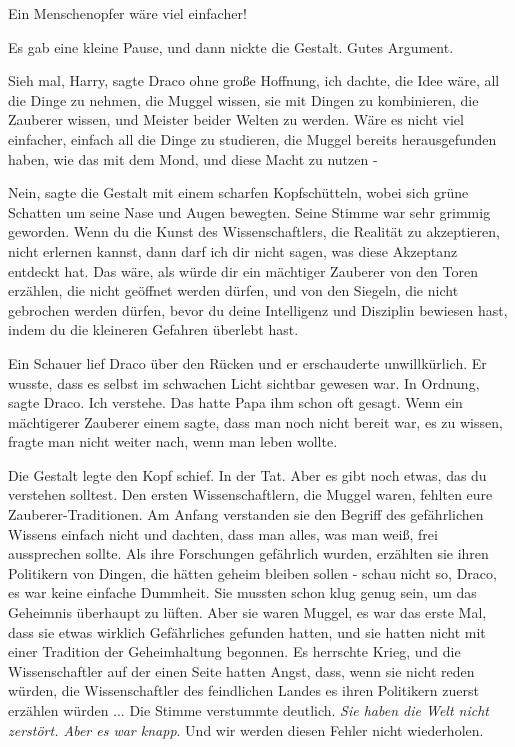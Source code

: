 \glqq{}Ein Menschenopfer wäre viel einfacher!\grqq{}

Es gab eine kleine Pause, und dann nickte die Gestalt. \glqq{}Gutes
Argument.\grqq{}

\glqq{}Sieh mal, Harry\grqq{}, sagte Draco ohne große Hoffnung, \glqq{}ich dachte,
die Idee wäre, all die Dinge zu nehmen, die Muggel wissen, sie mit Dingen zu
kombinieren, die Zauberer wissen, und Meister beider Welten zu werden. Wäre es
nicht viel einfacher, einfach all die Dinge zu studieren, die Muggel bereits
herausgefunden haben, wie das mit dem Mond, und diese Macht zu nutzen -\grqq{}

\glqq{}Nein\grqq{}, sagte die Gestalt mit einem scharfen Kopfschütteln, wobei
sich grüne Schatten um seine Nase und Augen bewegten. Seine Stimme war sehr
grimmig geworden. \glqq{}Wenn du die Kunst des Wissenschaftlers, die Realität zu
akzeptieren, nicht erlernen kannst, dann darf ich dir nicht sagen, was diese
Akzeptanz entdeckt hat. Das wäre, als würde dir ein mächtiger Zauberer von den
Toren erzählen, die nicht geöffnet werden dürfen, und von den Siegeln, die nicht
gebrochen werden dürfen, bevor du deine Intelligenz und Disziplin bewiesen hast,
indem du die kleineren Gefahren überlebt hast.\grqq{}

Ein Schauer lief Draco über den Rücken und er erschauderte unwillkürlich. Er
wusste, dass es selbst im schwachen Licht sichtbar gewesen war. \glqq{}In
Ordnung\grqq{}, sagte Draco. \glqq{}Ich verstehe.\grqq{} Das hatte Papa ihm
schon oft gesagt. Wenn ein mächtigerer Zauberer einem sagte, dass man noch nicht
bereit war, es zu wissen, fragte man nicht weiter nach, wenn man leben wollte.

Die Gestalt legte den Kopf schief. \glqq{}In der Tat. Aber es gibt noch etwas,
das du verstehen solltest. Den ersten Wissenschaftlern, die Muggel waren,
fehlten eure Zauberer-Traditionen. Am Anfang verstanden sie den Begriff des
gefährlichen Wissens einfach nicht und dachten, dass man alles, was man weiß,
frei aussprechen sollte. Als ihre Forschungen gefährlich wurden, erzählten sie
ihren Politikern von Dingen, die hätten geheim bleiben sollen - schau nicht so,
Draco, es war keine einfache Dummheit. Sie mussten schon klug genug sein, um das
Geheimnis überhaupt zu lüften. Aber sie waren Muggel, es war das erste Mal, dass
sie etwas wirklich Gefährliches gefunden hatten, und sie hatten nicht mit einer
Tradition der Geheimhaltung begonnen. Es herrschte Krieg, und die
Wissenschaftler auf der einen Seite hatten Angst, dass, wenn sie nicht reden
würden, die Wissenschaftler des feindlichen Landes es ihren Politikern zuerst
erzählen würden ...\grqq{} Die Stimme verstummte deutlich. \glqq{}\emph{Sie haben
die Welt nicht zerstört. Aber es war knapp}. Und wir werden diesen Fehler nicht
wiederholen.\grqq{}


